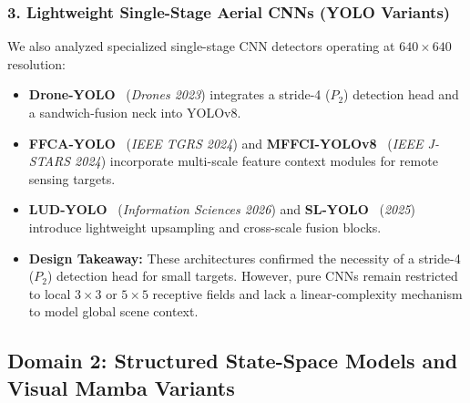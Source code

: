 \documentclass[11pt,a4paper]{article}
\begin{document}
\subsubsection*{3. Lightweight Single-Stage Aerial CNNs (YOLO Variants)}
We also analyzed specialized single-stage CNN detectors operating at $640\times 640$ resolution:
\begin{itemize}[leftmargin=1.5em]
    \item \textbf{Drone-YOLO}~\cite{zhang2023droneyolo} (\emph{Drones 2023}) integrates a stride-4 ($P_2$) detection head and a sandwich-fusion neck into YOLOv8.
    \item \textbf{FFCA-YOLO}~\cite{zhang2024ffcayolo} (\emph{IEEE TGRS 2024}) and \textbf{MFFCI-YOLOv8}~\cite{wang2024mffci} (\emph{IEEE J-STARS 2024}) incorporate multi-scale feature context modules for remote sensing targets.
    \item \textbf{LUD-YOLO}~\cite{li2026ludyolo} (\emph{Information Sciences 2026}) and \textbf{SL-YOLO}~\cite{chen2025slyolo} (\emph{2025}) introduce lightweight upsampling and cross-scale fusion blocks.
    \item \textbf{Design Takeaway:} These architectures confirmed the necessity of a stride-4 ($P_2$) detection head for small targets. However, pure CNNs remain restricted to local $3\times 3$ or $5\times 5$ receptive fields and lack a linear-complexity mechanism to model global scene context.
\end{itemize}

\subsection{Domain 2: Structured State-Space Models and Visual Mamba Variants}
\end{document}
